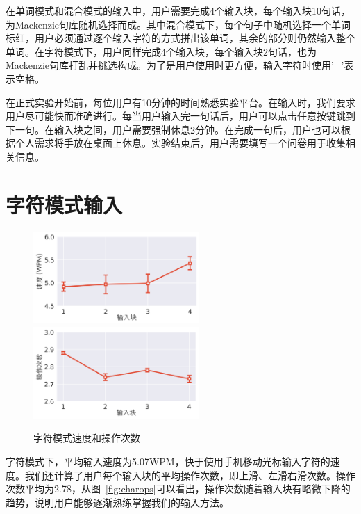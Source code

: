 在单词模式和混合模式的输入中，用户需要完成4个输入块，每个输入块10句话，为Mackenzie句库随机选择而成\cite{mackenzie2003phrase}。其中混合模式下，每个句子中随机选择一个单词标红，用户必须通过逐个输入字符的方式拼出该单词，其余的部分则仍然输入整个单词。在字符模式下，用户同样完成4个输入块，每个输入块2句话，也为Mackenzie句库\cite{mackenzie2003phrase}打乱并挑选构成。为了是用户使用时更方便，输入字符时使用'\_'表示空格。

在正式实验开始前，每位用户有10分钟的时间熟悉实验平台。在输入时，我们要求用户尽可能快而准确进行。每当用户输入完一句话后，用户可以点击任意按键跳到下一句。在输入块之间，用户需要强制休息2分钟。在完成一句后，用户也可以根据个人需求将手放在桌面上休息。实验结束后，用户需要填写一个问卷用于收集相关信息。

\section{字符模式输入}

\begin{figure}[h]
  \centering%
    {\includegraphics[height=3.5cm]{figures/charspeed.png}}%
  \hspace{4em}%
      {\includegraphics[height=3.5cm]{figures/ops.png}}
  \caption{字符模式速度和操作次数}
  \label{fig:charres}
\end{figure}

字符模式下，平均输入速度为5.07WPM，快于使用手机移动光标输入字符的速度\cite{2018forceboard}。我们还计算了用户每个输入块的平均操作次数，即上滑、左滑右滑次数。操作次数平均为2.78，从图~\ref{fig:charops}可以看出，操作次数随着输入块有略微下降的趋势，说明用户能够逐渐熟练掌握我们的输入方法。

